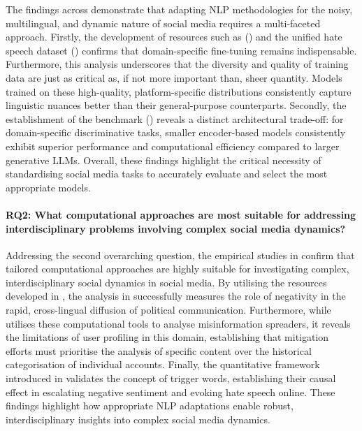 The findings across  demonstrate that adapting \ac{NLP} methodologies for the noisy, multilingual, and dynamic nature of social media requires a multi-faceted approach. Firstly, the development of resources such as {\XTOPIC} () and the unified hate speech dataset () confirms that domain-specific fine-tuning remains indispensable. Furthermore, this analysis underscores that the diversity and quality of training data are just as critical as, if not more important than, sheer quantity. Models trained on these high-quality, platform-specific distributions consistently capture linguistic nuances better than their general-purpose counterparts. Secondly, the establishment of the {\DATASET} benchmark () reveals a distinct architectural trade-off: for domain-specific discriminative tasks, smaller encoder-based models consistently exhibit superior performance and computational efficiency compared to larger generative \acp{LLM}. Overall, these findings highlight the critical necessity of standardising social media tasks to accurately evaluate and select the most appropriate models.

\paragraph{RQ2: What computational approaches are most suitable for addressing interdisciplinary problems involving complex social media dynamics?}

Addressing the second overarching question, the empirical studies in  confirm that tailored computational approaches are highly suitable for investigating complex, interdisciplinary social dynamics in social media. By utilising the resources developed in , the analysis in  successfully measures the role of negativity in the rapid, cross-lingual diffusion of political communication. Furthermore, while  utilises these computational tools to analyse misinformation spreaders, it  reveals the limitations of user profiling in this domain, establishing that mitigation efforts must prioritise the analysis of specific content over the historical categorisation of individual accounts. Finally, the quantitative framework introduced in  validates the concept of trigger words, establishing their causal effect in escalating negative sentiment and evoking hate speech online. These findings highlight how appropriate \ac{NLP} adaptations enable robust, interdisciplinary insights into complex social media dynamics.

